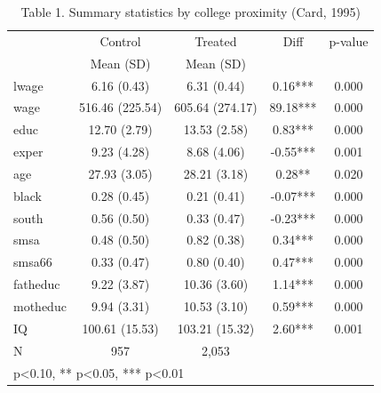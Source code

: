 \begin{table}[htbp]
\centering
\caption{Table 1. Summary statistics by college proximity (Card, 1995)}
\begin{tabular}{lcccc}
\hline\hline
 & Control & Treated & Diff & p-value \\
 & Mean (SD) & Mean (SD) & & \\
\hline
lwage & 6.16 (0.43) & 6.31 (0.44) & 0.16*** & 0.000 \\
wage & 516.46 (225.54) & 605.64 (274.17) & 89.18*** & 0.000 \\
educ & 12.70 (2.79) & 13.53 (2.58) & 0.83*** & 0.000 \\
exper & 9.23 (4.28) & 8.68 (4.06) & -0.55*** & 0.001 \\
age & 27.93 (3.05) & 28.21 (3.18) & 0.28** & 0.020 \\
black & 0.28 (0.45) & 0.21 (0.41) & -0.07*** & 0.000 \\
south & 0.56 (0.50) & 0.33 (0.47) & -0.23*** & 0.000 \\
smsa & 0.48 (0.50) & 0.82 (0.38) & 0.34*** & 0.000 \\
smsa66 & 0.33 (0.47) & 0.80 (0.40) & 0.47*** & 0.000 \\
fatheduc & 9.22 (3.87) & 10.36 (3.60) & 1.14*** & 0.000 \\
motheduc & 9.94 (3.31) & 10.53 (3.10) & 0.59*** & 0.000 \\
IQ & 100.61 (15.53) & 103.21 (15.32) & 2.60*** & 0.001 \\
\hline
N & 957 & 2,053 & & \\
\hline\hline
\multicolumn{5}{l}{\footnotesize * p<0.10, ** p<0.05, *** p<0.01} \\
\end{tabular}
\end{table}